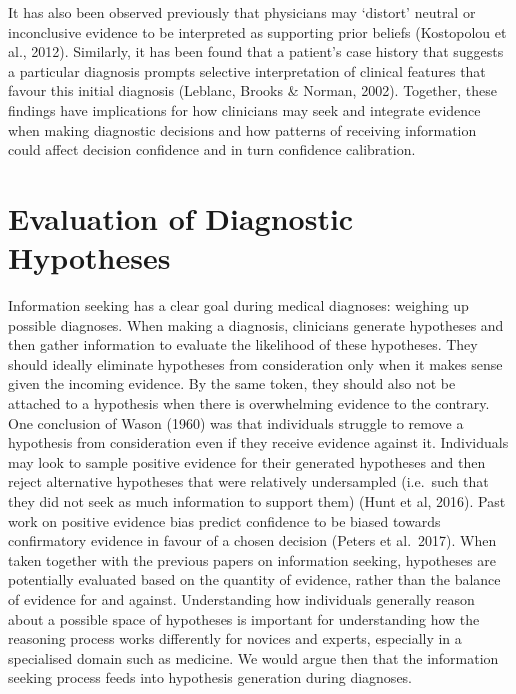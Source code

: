 \documentclass[a4paper, nobind]{templates/ociamthesis}
\begin{document}
\hfill\break
It has also been observed previously that physicians may `distort' neutral or inconclusive evidence to be interpreted as supporting prior beliefs (Kostopolou et al., 2012). Similarly, it has been found that a patient's case history that suggests a particular diagnosis prompts selective interpretation of clinical features that favour this initial diagnosis (Leblanc, Brooks \& Norman, 2002). Together, these findings have implications for how clinicians may seek and integrate evidence when making diagnostic decisions and how patterns of receiving information could affect decision confidence and in turn confidence calibration.

\section*{Evaluation of Diagnostic Hypotheses}\label{evaluation-of-diagnostic-hypotheses}

Information seeking has a clear goal during medical diagnoses: weighing up possible diagnoses. When making a diagnosis, clinicians generate hypotheses and then gather information to evaluate the likelihood of these hypotheses. They should ideally eliminate hypotheses from consideration only when it makes sense given the incoming evidence. By the same token, they should also not be attached to a hypothesis when there is overwhelming evidence to the contrary. One conclusion of Wason (1960) was that individuals struggle to remove a hypothesis from consideration even if they receive evidence against it. Individuals may look to sample positive evidence for their generated hypotheses and then reject alternative hypotheses that were relatively undersampled (i.e.~such that they did not seek as much information to support them) (Hunt et al, 2016). Past work on positive evidence bias predict confidence to be biased towards confirmatory evidence in favour of a chosen decision (Peters et al.~2017). When taken together with the previous papers on information seeking, hypotheses are potentially evaluated based on the quantity of evidence, rather than the balance of evidence for and against. Understanding how individuals generally reason about a possible space of hypotheses is important for understanding how the reasoning process works differently for novices and experts, especially in a specialised domain such as medicine. We would argue then that the information seeking process feeds into hypothesis generation during diagnoses.
\end{document}
